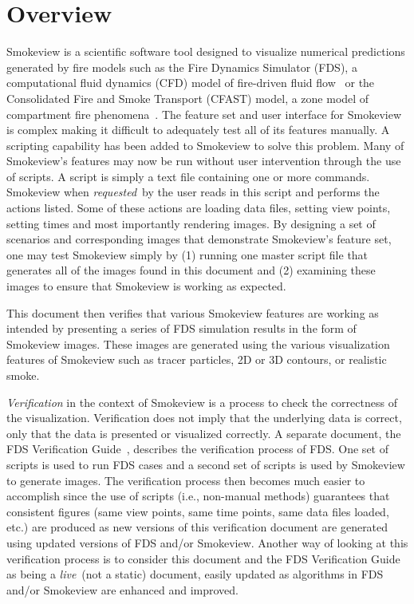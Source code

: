 \documentclass[11pt,twoside]{book}
\begin{document}
\chapter{Overview}
Smokeview is a scientific software tool designed to visualize numerical predictions generated by fire models such as the Fire Dynamics Simulator (FDS), a computational fluid dynamics (CFD) model of fire-driven fluid flow~\cite{FDS_Math_Guide,FDS_Users_Guide} or the Consolidated Fire and Smoke Transport (CFAST) model, a zone model of compartment fire phenomena~\cite{Jones:2004A}. The feature set and user interface for Smokeview is complex making it difficult to adequately test all of its features manually.  A scripting capability has been added to Smokeview to solve this problem. Many of Smokeview's features may now be run without user intervention through the use of scripts.  A script is simply a text file containing one or more commands.  Smokeview when {\em requested}\ by the user reads in this script and performs the actions listed. Some of these actions are loading data files, setting view points, setting times and most importantly rendering images.  By designing a set of scenarios and corresponding images that demonstrate Smokeview's feature set, one may test Smokeview simply by (1) running one master script file that generates all of the images found in this document and (2) examining these images to ensure that Smokeview is working as expected.

This document then verifies that various Smokeview features are working as intended by presenting a series of  FDS simulation results in the form of Smokeview images.  These images are generated using the various visualization features of Smokeview such as tracer particles, 2D or 3D contours, or realistic smoke.

{\em Verification} in the context of Smokeview is a process to check the correctness of the visualization.  Verification does not imply that the underlying data is correct, only that the data is presented or visualized correctly. A separate document, the FDS Verification Guide~\cite{FDS_Verification_Guide}, describes the verification process of FDS.  One set of scripts is used to run FDS cases and a second set of scripts is used by Smokeview to generate images.  The verification process then becomes much easier to accomplish since the use of scripts (i.e., non-manual methods) guarantees that consistent figures (same view points, same time points, same data files loaded, etc.) are produced as new versions of this verification document are generated using updated versions of FDS and/or Smokeview.  Another way of looking at this verification process is to consider this document and the FDS Verification Guide~\cite{FDS_Verification_Guide} as being a {\em  live}\ (not a static) document, easily updated as algorithms in FDS and/or Smokeview are enhanced and improved.
\end{document}
